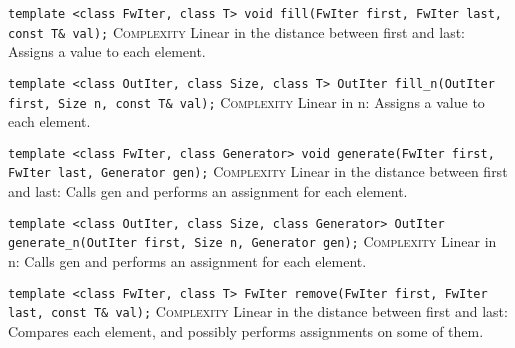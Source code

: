 \noindent{}\hspace*{0.25em}\lstinline[basicstyle=\ttfamily\color{corange}]{template <class FwIter, class T> void fill(FwIter first, FwIter last, const T& val);} \textsc{Complexity} Linear in the distance between first and last: Assigns a value to each element.\\\vspace{-0.6em}

\noindent{}\hspace*{0.25em}\lstinline[basicstyle=\ttfamily\color{corange}]{template <class OutIter, class Size, class T> OutIter fill_n(OutIter first, Size n, const T& val);} \textsc{Complexity} Linear in n: Assigns a value to each element.\\\vspace{-0.6em}

\noindent{}\hspace*{0.25em}\lstinline[basicstyle=\ttfamily\color{corange}]{template <class FwIter, class Generator> void generate(FwIter first, FwIter last, Generator gen);} \textsc{Complexity} Linear in the distance between first and last: Calls gen and performs an assignment for each element.\\\vspace{-0.6em}

\noindent{}\hspace*{0.25em}\lstinline[basicstyle=\ttfamily\color{corange}]{template <class OutIter, class Size, class Generator> OutIter generate_n(OutIter first, Size n, Generator gen);} \textsc{Complexity} Linear in n: Calls gen and performs an assignment for each element.\\\vspace{-0.6em}

\noindent{}\hspace*{0.25em}\lstinline[basicstyle=\ttfamily\color{corange}]{template <class FwIter, class T> FwIter remove(FwIter first, FwIter last, const T& val);} \textsc{Complexity} Linear in the distance between first and last: Compares each element, and possibly performs assignments on some of them.\\\vspace{-0.6em}

